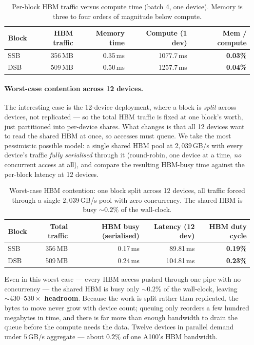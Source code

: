 \documentclass[11pt]{report}
\begin{document}
\begin{table}[h]
\centering
\caption{Per-block HBM traffic versus compute time (batch 4, one device).
Memory is three to four orders of magnitude below compute.}
\label{tab:mem-traffic}
\begin{tabular}{@{}lrrrr@{}}
\toprule
Block & HBM traffic & Memory time & Compute (1 dev) & Mem / compute \\
\midrule
SSB & 356\,MB & 0.35\,ms & 1077.7\,ms & \textbf{0.03\%} \\
DSB & 509\,MB & 0.50\,ms & 1257.7\,ms & \textbf{0.04\%} \\
\bottomrule
\end{tabular}
\end{table}

\paragraph{Worst-case contention across 12 devices.} The interesting case is
the 12-device deployment, where a block is \emph{split} across devices, not
replicated --- so the total HBM traffic is fixed at one block's worth, just
partitioned into per-device shares. What changes is that all 12 devices want
to read the shared HBM at once, so accesses must queue. We take the most
pessimistic possible model: a single shared HBM pool at $2{,}039$\,GB/s with
every device's traffic \emph{fully serialised} through it (round-robin, one
device at a time, \emph{no} concurrent access at all), and compare the
resulting HBM-busy time against the per-block latency at 12 devices.

\begin{table}[h]
\centering
\caption{Worst-case HBM contention: one block split across 12 devices, all
traffic forced through a single $2{,}039$\,GB/s pool with zero concurrency.
The shared HBM is busy ${\sim}0.2\%$ of the wall-clock.}
\label{tab:hbm-contention}
\begin{tabular}{@{}lrrrr@{}}
\toprule
Block & Total traffic & HBM busy (serialised) & Latency (12 dev) & HBM duty cycle \\
\midrule
SSB & 356\,MB & 0.17\,ms & 89.81\,ms & \textbf{0.19\%} \\
DSB & 509\,MB & 0.24\,ms & 104.81\,ms & \textbf{0.23\%} \\
\bottomrule
\end{tabular}
\end{table}

Even in this worst case --- every HBM access pushed through one pipe with no
concurrency --- the shared HBM is busy only ${\sim}0.2\%$ of the wall-clock,
leaving \textbf{${\sim}430$--$530\times$ headroom}. Because the work is split
rather than replicated, the bytes to move never grow with device count;
queuing only reorders a few hundred megabytes in time, and there is far more
than enough bandwidth to drain the queue before the compute needs the data.
Twelve devices in parallel demand under $5$\,GB/s aggregate --- about
$0.2\%$ of one A100's HBM bandwidth.
\end{document}
